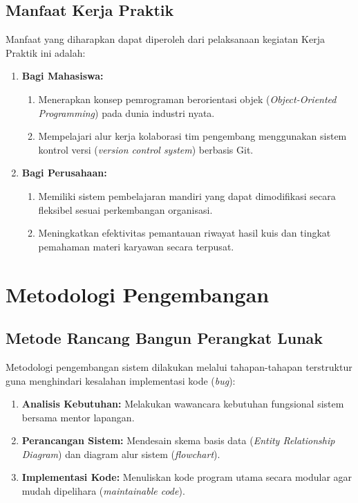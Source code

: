 \subsection{Manfaat Kerja Praktik}

Manfaat yang diharapkan dapat diperoleh dari pelaksanaan kegiatan Kerja Praktik ini adalah:

\begin{enumerate}[label=\Alph*]
    \item \textbf{Bagi Mahasiswa:}
    \begin{enumerate}[label=\arabic*)]
        \item Menerapkan konsep pemrograman berorientasi objek (\textit{Object-Oriented Programming}) pada dunia industri nyata.
        \item Mempelajari alur kerja kolaborasi tim pengembang menggunakan sistem kontrol versi (\textit{version control system}) berbasis Git.
    \end{enumerate}
    
    \item \textbf{Bagi Perusahaan:}
    \begin{enumerate}[label=\arabic*)]
        \item Memiliki sistem pembelajaran mandiri yang dapat dimodifikasi secara fleksibel sesuai perkembangan organisasi.
        \item Meningkatkan efektivitas pemantauan riwayat hasil kuis dan tingkat pemahaman materi karyawan secara terpusat.
    \end{enumerate}
\end{enumerate}

\section{Metodologi Pengembangan}

\subsection{Metode Rancang Bangun Perangkat Lunak}

Metodologi pengembangan sistem dilakukan melalui tahapan-tahapan terstruktur guna menghindari kesalahan implementasi kode (\textit{bug}):
\begin{enumerate}[label=\Alph*)]
    \item \textbf{Analisis Kebutuhan:} Melakukan wawancara kebutuhan fungsional sistem bersama mentor lapangan.
    \item \textbf{Perancangan Sistem:} Mendesain skema basis data (\textit{Entity Relationship Diagram}) dan diagram alur sistem (\textit{flowchart}).
    \item \textbf{Implementasi Kode:} Menuliskan kode program utama secara modular agar mudah dipelihara (\textit{maintainable code}).
\end{enumerate}

